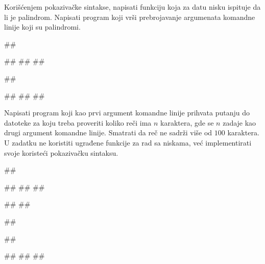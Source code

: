\begin{Exercise}[label=2_05]
Korišćenjem pokazivačke sintakse, napisati funkciju koja
za datu nisku ispituje da li je palindrom. Napisati program koji
vrši prebrojavanje argumenata komandne linije koji su
palindromi.

\begin{miditest}
\begin{upotreba}{1}
##

#\naslovInt#
##
##
\end{upotreba}
\end{miditest}
\begin{miditest}
\begin{upotreba}{2}
##

#\naslovInt#
##
##
\end{upotreba}
\end{miditest}

\end{Exercise}
\begin{Answer}[ref=2_05]
\end{Answer}

\begin{Exercise}[label=2_06]
Napisati program koji kao prvi argument komandne linije prihvata
putanju do datoteke za koju treba proveriti koliko reči ima
$n$ karaktera, gde se $n$ zadaje kao drugi argument
komandne linije. Smatrati da reč ne sadrži više od $100$ karaktera.
U zadatku ne koristiti ugrađene funkcije za rad sa niskama, 
već implementirati svoje koristeći pokazivačku sintaksu.

\begin{miditest}
\begin{upotreba}{1}
##

##
##
##

#\naslovInt#
##
\end{upotreba}
\end{miditest}
\begin{miditest}
\begin{upotreba}{2}
##

##

#\naslovInt#
#\naslovIzlazZaGresku#
##
\end{upotreba}
\end{miditest}

\end{Exercise}
\begin{Answer}[ref=2_06]
\end{Answer}

